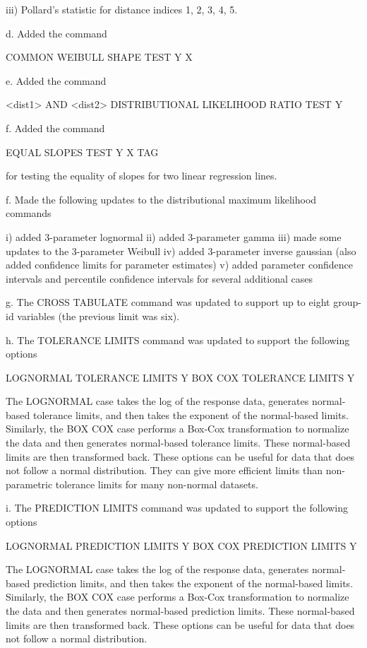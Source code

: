         iii) Pollard's statistic for distance indices 1, 2, 3, 4, 5.

    d. Added the command

         COMMON WEIBULL SHAPE TEST Y X

    e. Added the command

         <dist1> AND <dist2> DISTRIBUTIONAL LIKELIHOOD RATIO TEST Y

    f. Added the command

         EQUAL SLOPES TEST Y X TAG

       for testing the equality of slopes for two linear regression lines.

    f. Made the following updates to the distributional maximum
       likelihood commands

          i) added 3-parameter lognormal
         ii) added 3-parameter gamma
        iii) made some updates to the 3-parameter Weibull
         iv) added 3-parameter inverse gaussian (also added confidence
             limits for parameter estimates)
          v) added parameter confidence intervals and percentile
             confidence intervals for several additional cases

    g. The CROSS TABULATE command was updated to support up to eight
       group-id variables (the previous limit was six).

    h. The TOLERANCE LIMITS command was updated to support the following
       options

          LOGNORMAL TOLERANCE LIMITS Y
          BOX COX TOLERANCE LIMITS Y

       The LOGNORMAL case takes the log of the response data, generates
       normal-based tolerance limits, and then takes the exponent of the
       normal-based limits.  Similarly, the BOX COX case performs a
       Box-Cox transformation to normalize the data and then generates
       normal-based tolerance limits.  These normal-based limits are
       then transformed back.  These options can be useful for data that
       does not follow a normal distribution. They can give more
       efficient limits than non-parametric tolerance limits for many
       non-normal datasets.

    i. The PREDICTION LIMITS command was updated to support the
       following options

          LOGNORMAL PREDICTION LIMITS Y
          BOX COX PREDICTION LIMITS Y

       The LOGNORMAL case takes the log of the response data, generates
       normal-based prediction limits, and then takes the exponent of the
       normal-based limits.  Similarly, the BOX COX case performs a
       Box-Cox transformation to normalize the data and then generates
       normal-based prediction limits.  These normal-based limits are
       then transformed back.  These options can be useful for data that
       does not follow a normal distribution.

